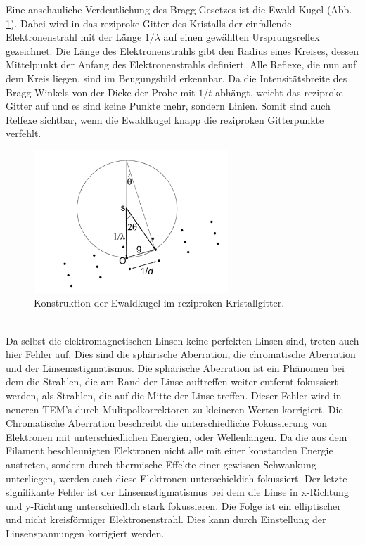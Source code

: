 \documentclass[a4paper,11pt,DIV=11]{scrartcl}
\begin{document}
Eine anschauliche Verdeutlichung des Bragg-Gesetzes ist die Ewald-Kugel (Abb. \ref{ewald}). Dabei wird in das reziproke Gitter des Kristalls der einfallende Elektronenstrahl mit der Länge \(1/\lambda\) auf einen gewählten Ursprungsreflex gezeichnet. Die Länge des Elektronenstrahls gibt den Radius eines Kreises, dessen Mittelpunkt der Anfang des Elektronenstrahls definiert. Alle Reflexe, die nun auf dem Kreis liegen, sind im Beugungsbild erkennbar. Da die Intensitätsbreite des Bragg-Winkels von der Dicke der Probe mit \(1/t\) abhängt, weicht das reziproke Gitter auf und es sind keine Punkte mehr, sondern Linien. Somit sind auch Relfexe sichtbar, wenn die Ewaldkugel knapp die reziproken Gitterpunkte verfehlt.
\begin{figure}\center
\includegraphics[width=0.65\textwidth]{ewald.png}
\caption{Konstruktion der Ewaldkugel im reziproken Kristallgitter.}
\label{ewald}
\end{figure}
\\
Da selbst die elektromagnetischen Linsen keine perfekten Linsen sind, treten auch hier Fehler auf. Dies sind die sphärische Aberration, die chromatische Aberration und der Linsenastigmatismus. Die sphärische Aberration ist ein Phänomen bei dem die Strahlen, die am Rand der Linse auftreffen weiter entfernt fokussiert werden, als Strahlen, die auf die Mitte der Linse treffen. Dieser Fehler wird in neueren TEM's durch Mulitpolkorrektoren zu kleineren Werten korrigiert. Die Chromatische Aberration beschreibt die unterschiedliche Fokussierung von Elektronen mit unterschiedlichen Energien, oder Wellenlängen. Da die aus dem Filament beschleunigten Elektronen nicht alle mit einer konstanden Energie austreten, sondern durch thermische Effekte einer gewissen Schwankung unterliegen, werden auch diese Elektronen unterschieldich fokussiert. Der letzte signifikante Fehler ist der Linsenastigmatismus bei dem die Linse in x-Richtung und y-Richtung unterschiedlich stark fokussieren. Die Folge ist ein elliptischer und nicht kreisförmiger Elektronenstrahl. Dies kann durch Einstellung der Linsenspannungen korrigiert werden.
	
\end{document}
